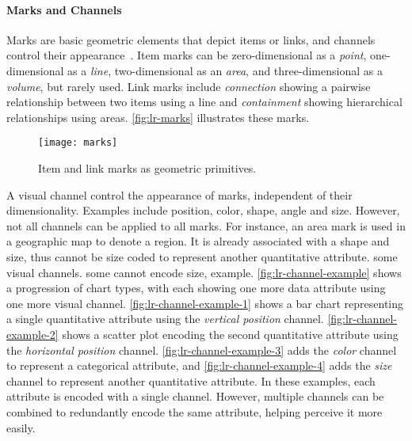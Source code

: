 \paragraph{Marks and Channels}
Marks are basic geometric elements that depict items or links, and channels control their appearance~\cite{Munzner2014}. Item marks can be zero-dimensional as a \emph{point}, one-dimensional as a \emph{line}, two-dimensional as an \emph{area}, and three-dimensional as a \emph{volume}, but rarely used. Link marks include \emph{connection} showing a pairwise relationship between two items using a line and \emph{containment} showing hierarchical relationships using areas. \autoref{fig:lr-marks} illustrates these marks. 

\begin{figure}[!htb]
	\centering
	\texttt{[image: marks]}
	\caption{Item and link marks as geometric primitives. }
	\label{fig:lr-marks}
\end{figure}

A visual channel control the appearance of marks, independent of their dimensionality. Examples include position, color, shape, angle and size. However, not all channels can be applied to all marks. For instance, an area mark is used in a geographic map to denote a region. It is already associated with a shape and size, thus cannot be size coded to represent another quantitative attribute.
some visual channels. some cannot encode size, example. \autoref{fig:lr-channel-example} shows a progression of chart types, with each showing one more data attribute using one more visual channel. \autoref{fig:lr-channel-example-1} shows a bar chart representing a single quantitative attribute using the \emph{vertical position} channel. \autoref{fig:lr-channel-example-2} shows a scatter plot encoding the second quantitative attribute using the \emph{horizontal position} channel. \autoref{fig:lr-channel-example-3} adds the \emph{color} channel to represent a categorical attribute, and \autoref{fig:lr-channel-example-4} adds the \emph{size} channel to represent another quantitative attribute. In these examples, each attribute is encoded with a single channel. However, multiple channels can be combined to redundantly encode the same attribute, helping perceive it more easily.


